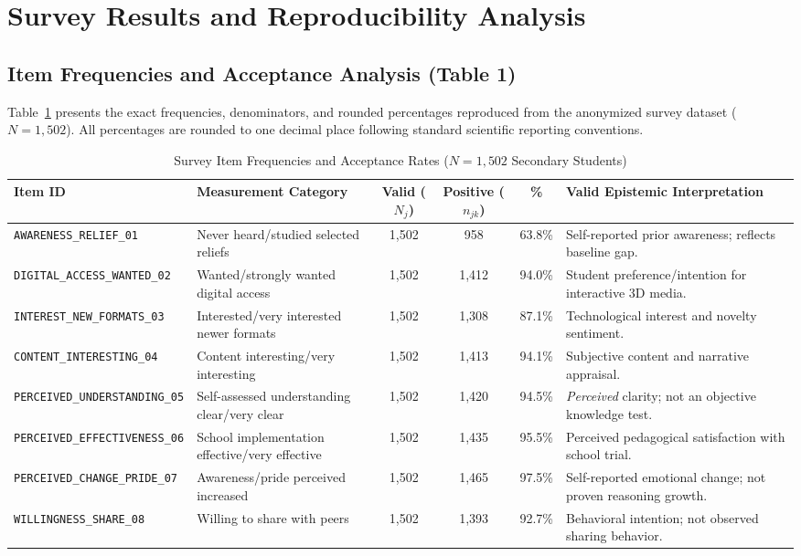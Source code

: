\documentclass[journal]{IEEEtran}
\begin{document}
\section{Survey Results and Reproducibility Analysis}

\subsection{Item Frequencies and Acceptance Analysis (Table 1)}
Table~\ref{tab:table1} presents the exact frequencies, denominators, and rounded percentages reproduced from the anonymized survey dataset ($N = 1,502$). All percentages are rounded to one decimal place following standard scientific reporting conventions.

\begin{table}[t]
\centering
\caption{Survey Item Frequencies and Acceptance Rates ($N=1,502$ Secondary Students)}
\label{tab:table1}
\begin{tabular}{@{}llcccl@{}}
\toprule
\textbf{Item ID} & \textbf{Measurement Category} & \textbf{Valid ($N_j$)} & \textbf{Positive ($n_{jk}$)} & \textbf{\%} & \textbf{Valid Epistemic Interpretation} \\ \midrule
\texttt{AWARENESS\_RELIEF\_01} & Never heard/studied selected reliefs & 1,502 & 958 & 63.8\% & Self-reported prior awareness; reflects baseline gap. \\
\texttt{DIGITAL\_ACCESS\_WANTED\_02} & Wanted/strongly wanted digital access & 1,502 & 1,412 & 94.0\% & Student preference/intention for interactive 3D media. \\
\texttt{INTEREST\_NEW\_FORMATS\_03} & Interested/very interested newer formats & 1,502 & 1,308 & 87.1\% & Technological interest and novelty sentiment. \\
\texttt{CONTENT\_INTERESTING\_04} & Content interesting/very interesting & 1,502 & 1,413 & 94.1\% & Subjective content and narrative appraisal. \\
\texttt{PERCEIVED\_UNDERSTANDING\_05} & Self-assessed understanding clear/very clear & 1,502 & 1,420 & 94.5\% & \textit{Perceived} clarity; not an objective knowledge test. \\
\texttt{PERCEIVED\_EFFECTIVENESS\_06} & School implementation effective/very effective & 1,502 & 1,435 & 95.5\% & Perceived pedagogical satisfaction with school trial. \\
\texttt{PERCEIVED\_CHANGE\_PRIDE\_07} & Awareness/pride perceived increased & 1,502 & 1,465 & 97.5\% & Self-reported emotional change; not proven reasoning growth. \\
\texttt{WILLINGNESS\_SHARE\_08} & Willing to share with peers & 1,502 & 1,393 & 92.7\% & Behavioral intention; not observed sharing behavior. \\ \bottomrule
\end{tabular}
\end{table}
\end{document}
